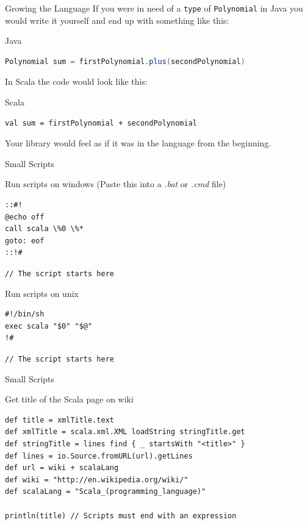 \begin{frame}[fragile]{Growing the Language}
If you were in need of a \lstinline!type! of \lstinline!Polynomial! in Java you
would write it yourself and end up with something like this:
\begin{exampleblock}{Java}
\begin{lstlisting}[language=java]
Polynomial sum = firstPolynomial.plus(secondPolynomial)
\end{lstlisting}
\end{exampleblock}
In Scala the code would look like this:
\begin{exampleblock}{Scala}
\begin{lstlisting}
val sum = firstPolynomial + secondPolynomial
\end{lstlisting}
\end{exampleblock}
Your library would feel as if it was in the language from the beginning.
\end{frame}

\begin{frame}[fragile]{Small Scripts}
\begin{exampleblock}{Run scripts on windows (Paste this into a \emph{.bat}
or \emph{.cmd} file)}
\begin{verbatim}
::#! 
@echo off 
call scala \%0 \%* 
goto: eof 
::!#
\end{verbatim}
\lstinline!// The script starts here!
\end{exampleblock}
\begin{exampleblock}{Run scripts on unix}
\begin{verbatim}
#!/bin/sh
exec scala "$0" "$@"
!#
\end{verbatim}
\lstinline!// The script starts here!
\end{exampleblock}
\end{frame}

\begin{frame}[fragile]{Small Scripts}
\begin{exampleblock}{Get title of the Scala page on wiki}
\begin{lstlisting}
def title = xmlTitle.text
def xmlTitle = scala.xml.XML loadString stringTitle.get
def stringTitle = lines find { _ startsWith "<title>" }
def lines = io.Source.fromURL(url).getLines
def url = wiki + scalaLang
def wiki = "http://en.wikipedia.org/wiki/"
def scalaLang = "Scala_(programming_language)"

println(title) // Scripts must end with an expression
\end{lstlisting}
\end{exampleblock}
\end{frame}

